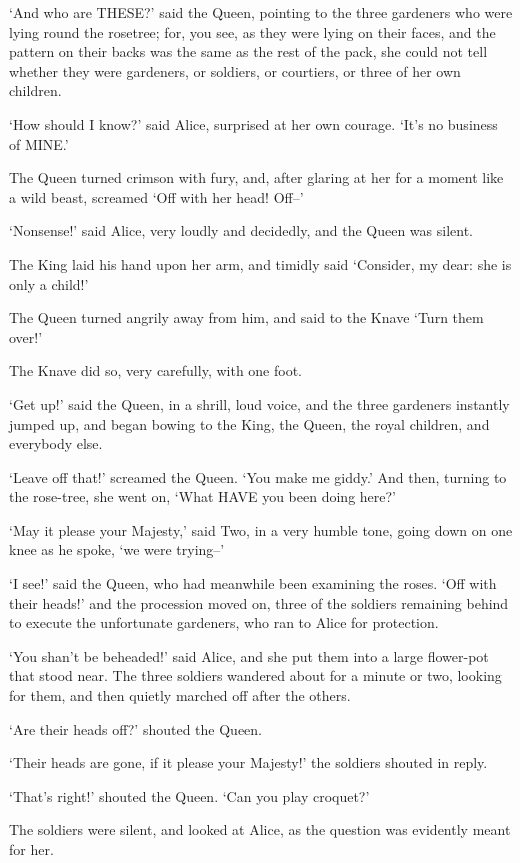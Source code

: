 \documentclass[12pt]{book}
\begin{document}
  `And who are THESE?' said the Queen, pointing to the three
gardeners who were lying round the rosetree; for, you see, as
they were lying on their faces, and the pattern on their backs
was the same as the rest of the pack, she could not tell whether
they were gardeners, or soldiers, or courtiers, or three of her
own children.

  `How should I know?' said Alice, surprised at her own courage.
`It's no business of MINE.'

  The Queen turned crimson with fury, and, after glaring at her
for a moment like a wild beast, screamed `Off with her head!
Off--'

  `Nonsense!' said Alice, very loudly and decidedly, and the
Queen was silent.

  The King laid his hand upon her arm, and timidly said
`Consider, my dear:  she is only a child!'

  The Queen turned angrily away from him, and said to the Knave
`Turn them over!'

  The Knave did so, very carefully, with one foot.

  `Get up!' said the Queen, in a shrill, loud voice, and the
three gardeners instantly jumped up, and began bowing to the
King, the Queen, the royal children, and everybody else.

  `Leave off that!' screamed the Queen.  `You make me giddy.'
And then, turning to the rose-tree, she went on, `What HAVE you
been doing here?'

  `May it please your Majesty,' said Two, in a very humble tone,
going down on one knee as he spoke, `we were trying--'

  `I see!' said the Queen, who had meanwhile been examining the
roses.  `Off with their heads!' and the procession moved on,
three of the soldiers remaining behind to execute the unfortunate
gardeners, who ran to Alice for protection.

  `You shan't be beheaded!' said Alice, and she put them into a
large flower-pot that stood near.  The three soldiers wandered
about for a minute or two, looking for them, and then quietly
marched off after the others.

  `Are their heads off?' shouted the Queen.

  `Their heads are gone, if it please your Majesty!' the soldiers
shouted in reply.

  `That's right!' shouted the Queen.  `Can you play croquet?'

  The soldiers were silent, and looked at Alice, as the question
was evidently meant for her.
\end{document}
